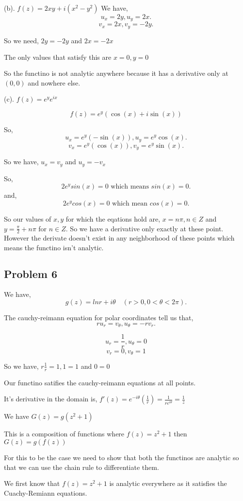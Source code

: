 \documentclass[a4paper]{report}
\begin{document}
(b). $f(z) = 2xy + i(x^2 - y^2)$
We have, \[
u_x = 2y, u_y = 2x
.\] 
\[
v_x = 2x, v_y = -2y
.\] 

So we need, $2y = -2y$ and $2x = -2x$

The only values that satisfy this are  $x = 0, y = 0$

So the functino is not analytic anywhere because it has a derivative only at  $(0,0)$ and nowhere else.

(c).  $f(z) = e^ye^{ix}$

$$f(z) = e^y(\cos(x) + i\sin(x))$$


So, \[
u_x = e^y(-\sin(x)), u_y = e^y\cos(x)
.\] 
\[
v_x = e^y(\cos(x)), v_y = e^y \sin(x)
.\] 

So we have, $u_x = v_y$ and $u_y = -v_x$

So,  \[
    2e^ysin(x) = 0 \text{ which means } sin(x) = 0
.\] 
and, \[
    2e^ycos(x) = 0 \text { which mean } cos(x) = 0
.\] 

So our values of $x,y$ for which the eqations hold are, $x = n\pi, n \in Z$ and $y = \frac{\pi}{2} + n\pi$ for $n \in Z$. So we have a derivative only exactly at these point. However the derivate doesn't exist in any neighborhood of these points which means the functino isn't analytic.

\subsection*{Problem 6}
We have, \[
g(z) = ln r + i \theta \quad (r > 0, 0 < \theta < 2\pi)
.\] 

The cauchy-reimann equation for polar coordinates tell us that, \[
    ru_r = v_{\theta}, u_{\theta} = -r v_r
.\] 

$$u_r = \frac{1}{r}, u_\theta = 0$$
$$v_r = 0, v_\theta = 1$$


So we have, $r \frac{1}{r} = 1, 1 = 1$ and $0 = 0$ 

Our functino satifies the cauchy-reimann equations at all points.

It's derivative in the domain is, $f'(z) = e^{-i\theta}(\frac{1}{r}) = \frac{1}{re^{i\theta}} = \frac{1}{z}$ 

We have $G(z) = g(z^2+ 1)$

This is a composition of functions where $f(z) = z^2 + 1$ then $G(z) = g(f(z))$

For this to be the case we need to show that both the functinos are analytic so that we can use the chain rule to differentiate them.

We first know that $f(z) = z^2 + 1$ is analytic everywhere as it satisfies the Cuachy-Remiann equations.
\end{document}
